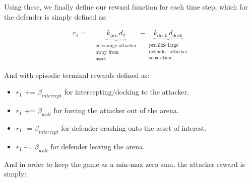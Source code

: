 Using these, we finally define our reward function for each time step, which for the defender is simply defined as:


\begin{equation}
\label{eq:attacker_step_reward}
\boxed{
\begin{aligned}
r_1
= {}&
\underbrace{k_{\text{pos}}\, d_2}_{\substack{\text{encourage attacker}\\\text{away from}\\\text{asset}}}
-
\underbrace{k_{\text{dock}}\, d_{\text{dock}}}_{\substack{\text{penalize large}\\\text{defender--attacker}\\\text{separation}}}
\end{aligned}
}
\end{equation}



And with episodic terminal rewards defined as:

\begin{itemize}
    \item $r_1$ += $\beta_{intercept}$ for intercepting/docking to the attacker.
    \item $r_1$ += $\beta_{wall}$ for forcing the attacker out of the arena.
    \item $r_1$ -= $\beta_{intercept}$ for defender crashing onto the asset of interest.
    \item $r_1$ -= $\beta_{wall}$ for defender leaving the arena.
    
\end{itemize}

And in order to keep the game as a min-max zero sum, the attacker reward is simply: 

